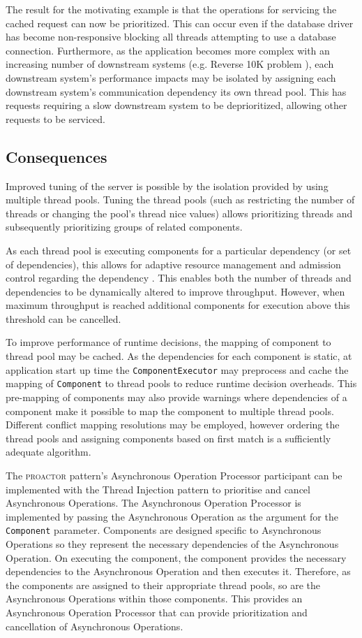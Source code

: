 \documentclass[prodmode]{style/acmlarge}
\begin{document}
The result for the motivating example is that the operations for servicing the
cached request can now be prioritized.  This can occur even if the database
driver has become non-responsive blocking all threads attempting to use a
database connection.  Furthermore, as the application becomes more complex with
an increasing number of downstream systems (e.g. Reverse 10K problem
\cite{reverse-ten-k-problem}), each downstream system's performance impacts may
be isolated by assigning each downstream system's communication dependency its
own thread pool.  This has requests requiring a slow downstream system to be
deprioritized, allowing other requests to be serviced.


\subsection{Consequences}

Improved tuning of the server is possible by the isolation provided by using
multiple thread pools.  Tuning the thread pools (such as restricting the number
of threads or changing the pool's thread nice values) allows prioritizing
threads and subsequently prioritizing groups of related components.

As each thread pool is executing components for a particular dependency (or set
of dependencies), this allows for adaptive resource management and admission
control regarding the dependency \cite{seda}.  This enables both the number of
threads and dependencies to be dynamically altered to improve throughput.
However, when maximum throughput is reached additional components for execution
above this threshold can be cancelled.

To improve performance of runtime decisions, the mapping of component to thread
pool may be cached.  As the dependencies for each component is static, at
application start up time the \texttt{ComponentExecutor} may preprocess and
cache the mapping of \texttt{Component} to thread pools to reduce runtime
decision overheads.  This pre-mapping of components may also provide warnings
where dependencies of a component make it possible to map the component to
multiple thread pools.  Different conflict mapping resolutions may be employed,
however ordering the thread pools and assigning components based on first match
is a sufficiently adequate algorithm.

The \textsc{proactor} pattern's Asynchronous Operation Processor participant can
be implemented with the Thread Injection pattern to prioritise and cancel
Asynchronous Operations.  The Asynchronous Operation Processor is implemented by
passing the Asynchronous Operation as the argument for the \texttt{Component}
parameter.  Components are designed specific to Asynchronous Operations so they
represent the necessary dependencies of the Asynchronous Operation.  On
executing the component, the component provides the necessary dependencies to
the Asynchronous Operation and then executes it.  Therefore, as the components
are assigned to their appropriate thread pools, so are the Asynchronous
Operations within those components.  This provides an Asynchronous Operation
Processor that can provide prioritization and cancellation of Asynchronous
Operations.
\end{document}
